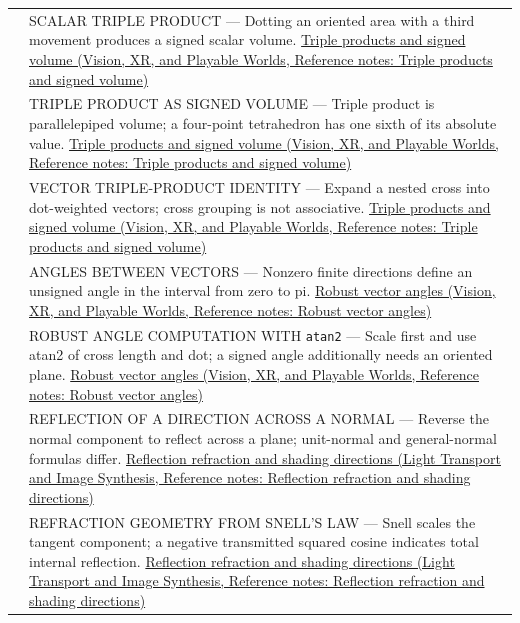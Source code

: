 {\begin{longtable}[]{@{}
  >{\raggedright\arraybackslash}p{}
  >{\raggedright\arraybackslash}p{}@{}}
548 & SCALAR TRIPLE PRODUCT --- Dotting an oriented area with a third movement produces a signed scalar volume. \href{../07-Vision-XR-and-Playable-Worlds/main.pdf\#nameddest=appendix-5caa058bd9c7}{Triple products and signed volume (Vision, XR, and Playable Worlds, Reference notes: Triple products and signed volume)} \\
549 & TRIPLE PRODUCT AS SIGNED VOLUME --- Triple product is parallelepiped volume; a four-point tetrahedron has one sixth of its absolute value. \href{../07-Vision-XR-and-Playable-Worlds/main.pdf\#nameddest=appendix-5caa058bd9c7}{Triple products and signed volume (Vision, XR, and Playable Worlds, Reference notes: Triple products and signed volume)} \\
550 & VECTOR TRIPLE-PRODUCT IDENTITY --- Expand a nested cross into dot-weighted vectors; cross grouping is not associative. \href{../07-Vision-XR-and-Playable-Worlds/main.pdf\#nameddest=appendix-5caa058bd9c7}{Triple products and signed volume (Vision, XR, and Playable Worlds, Reference notes: Triple products and signed volume)} \\
551 & ANGLES BETWEEN VECTORS --- Nonzero finite directions define an unsigned angle in the interval from zero to pi. \href{../07-Vision-XR-and-Playable-Worlds/main.pdf\#nameddest=appendix-e569e60e18e6}{Robust vector angles (Vision, XR, and Playable Worlds, Reference notes: Robust vector angles)} \\
552 & ROBUST ANGLE COMPUTATION WITH \texttt{atan2} --- Scale first and use atan2 of cross length and dot; a signed angle additionally needs an oriented plane. \href{../07-Vision-XR-and-Playable-Worlds/main.pdf\#nameddest=appendix-e569e60e18e6}{Robust vector angles (Vision, XR, and Playable Worlds, Reference notes: Robust vector angles)} \\
553 & REFLECTION OF A DIRECTION ACROSS A NORMAL --- Reverse the normal component to reflect across a plane; unit-normal and general-normal formulas differ. \href{../04-Light-Transport-and-Image-Synthesis/main.pdf\#nameddest=appendix-44e00863b4d5}{Reflection refraction and shading directions (Light Transport and Image Synthesis, Reference notes: Reflection refraction and shading directions)} \\
554 & REFRACTION GEOMETRY FROM SNELL'S LAW --- Snell scales the tangent component; a negative transmitted squared cosine indicates total internal reflection. \href{../04-Light-Transport-and-Image-Synthesis/main.pdf\#nameddest=appendix-44e00863b4d5}{Reflection refraction and shading directions (Light Transport and Image Synthesis, Reference notes: Reflection refraction and shading directions)} \\

\end{longtable}}
